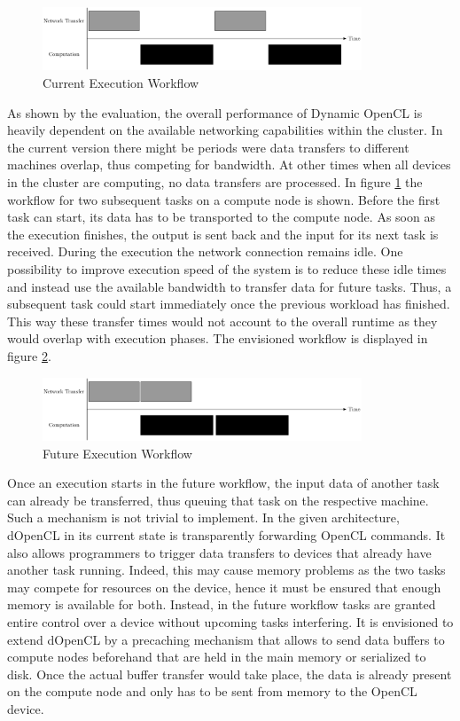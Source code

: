\begin{figure}[!htb]
	\includegraphics[width=0.85\textwidth]{drawings/missing_queue.pdf}
	\centering
	\caption{Current Execution Workflow}
	\label{img:missing_queuing}
\end{figure}
As shown by the evaluation, the overall performance of Dynamic OpenCL is heavily dependent on the available networking capabilities within the cluster. In the current version there might be periods were data transfers to different machines overlap, thus competing for bandwidth. At other times when all devices in the cluster are computing, no data transfers are processed. In figure \ref{img:missing_queuing} the workflow for two subsequent tasks on a compute node is shown. Before the first task can start, its data has to be transported to the compute node. As soon as the execution finishes, the output is sent back and the input for its next task is received. During the execution the network connection remains idle. One possibility to improve execution speed of the system is to reduce these idle times and instead use the available bandwidth to transfer data for future tasks. Thus, a subsequent task could start immediately once the previous workload has finished. This way these transfer times would not account to the overall runtime as they would overlap with execution phases. The envisioned workflow is displayed in figure \ref{img:active_queueing}.

\begin{figure}[!htb]
	\includegraphics[width=0.85\textwidth]{drawings/active_queue.pdf}
	\centering
	\caption{Future Execution Workflow}
	\label{img:active_queueing}
\end{figure}

Once an execution starts in the future workflow, the input data of another task can already be transferred, thus queuing that task on the respective machine. Such a mechanism is not trivial to implement. In the given architecture, dOpenCL in its current state is transparently forwarding OpenCL commands. It also allows programmers to trigger data transfers to devices that already have another task running. Indeed, this may cause memory problems as the two tasks may compete for resources on the device, hence it must be ensured that enough memory is available for both. Instead, in the future workflow tasks are granted entire control over a device without upcoming tasks interfering. It is envisioned to extend dOpenCL by a precaching mechanism that allows to send data buffers to compute nodes beforehand that are held in the main memory or serialized to disk. Once the actual buffer transfer would take place, the data is already present on the compute node and only has to be sent from memory to the OpenCL device.

